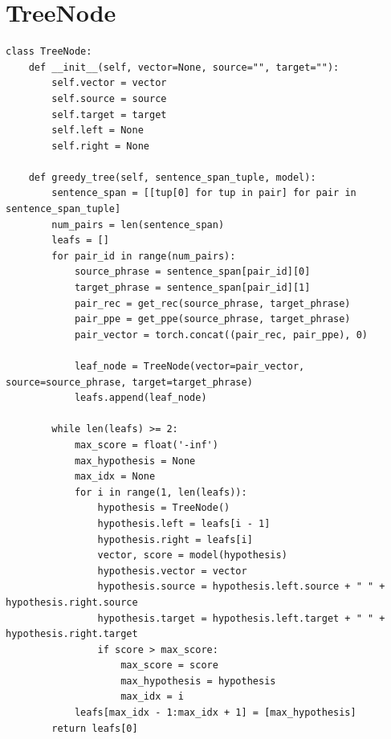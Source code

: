 \documentclass[12pt,a4paper,twoside]{report}
\begin{document}
\section{TreeNode}
\begin{lstlisting}
class TreeNode:
    def __init__(self, vector=None, source="", target=""):
        self.vector = vector
        self.source = source
        self.target = target
        self.left = None
        self.right = None

    def greedy_tree(self, sentence_span_tuple, model):
        sentence_span = [[tup[0] for tup in pair] for pair in sentence_span_tuple]
        num_pairs = len(sentence_span)
        leafs = []
        for pair_id in range(num_pairs):
            source_phrase = sentence_span[pair_id][0]
            target_phrase = sentence_span[pair_id][1]
            pair_rec = get_rec(source_phrase, target_phrase)
            pair_ppe = get_ppe(source_phrase, target_phrase)
            pair_vector = torch.concat((pair_rec, pair_ppe), 0)

            leaf_node = TreeNode(vector=pair_vector, source=source_phrase, target=target_phrase)
            leafs.append(leaf_node)

        while len(leafs) >= 2:
            max_score = float('-inf')
            max_hypothesis = None
            max_idx = None
            for i in range(1, len(leafs)):
                hypothesis = TreeNode()
                hypothesis.left = leafs[i - 1]
                hypothesis.right = leafs[i]
                vector, score = model(hypothesis)
                hypothesis.vector = vector
                hypothesis.source = hypothesis.left.source + " " + hypothesis.right.source
                hypothesis.target = hypothesis.left.target + " " + hypothesis.right.target
                if score > max_score:
                    max_score = score
                    max_hypothesis = hypothesis
                    max_idx = i
            leafs[max_idx - 1:max_idx + 1] = [max_hypothesis]
        return leafs[0]
\end{lstlisting}
\end{document}

